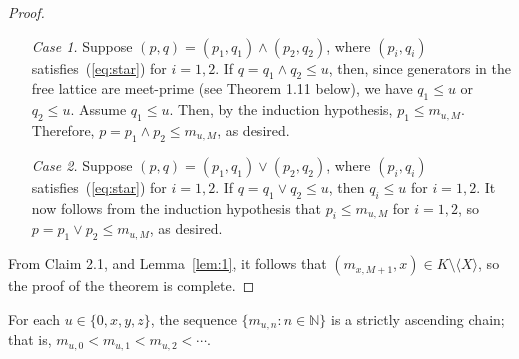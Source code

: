 \begin{proof}
\begin{itemize}
\item[{\it Case 1.}] Suppose $(p, q) = (p_1, q_1) \wedge (p_2, q_2)$, where 
  $(p_i, q_i)$ satisfies~(\ref{eq:star}) for $i = 1, 2$.    
  If $q= q_1 \wedge q_2 \leqslant u$, then, since generators in the free lattice are meet-prime (see Theorem 1.11 below), we have $q_1\leqslant u$ or $q_2\leqslant u$. Assume $q_1\leqslant u$.  Then, by the induction hypothesis, $p_1\leqslant m_{u, M}$.  Therefore, $p = p_1\wedge p_2 \leqslant m_{u, M}$, as desired.

\item[{\it Case 2.}] Suppose $(p, q) = (p_1, q_1) \vee (p_2, q_2)$, where 
  $(p_i, q_i)$ satisfies~(\ref{eq:star}) for $i = 1, 2$.    
  If $q= q_1 \vee q_2 \leqslant u$, then 
  $q_i \leqslant u$ for $i = 1, 2$.
  It now follows from the induction hypothesis that $p_i\leqslant m_{u, M}$ for $i = 1, 2$, so 
  $p = p_1 \vee p_2 \leqslant m_{u, M}$, as desired.
\end{itemize}

From Claim 2.1, and Lemma~\ref{lem:1}, it follows that $(m_{x, M+1}, x)\in K \setminus \langle X \rangle$, so the proof of the theorem is complete.
\end{proof}

\begin{lemma}%
  \label{lem:1}
For each $u \in \{0, x, y, z\}$, the sequence $\{m_{u,n} : n \in \mathbb N\}$ is a strictly ascending chain; that is, $m_{u,0} < m_{u,1} < m_{u,2} < \cdots$.  
\end{lemma}

